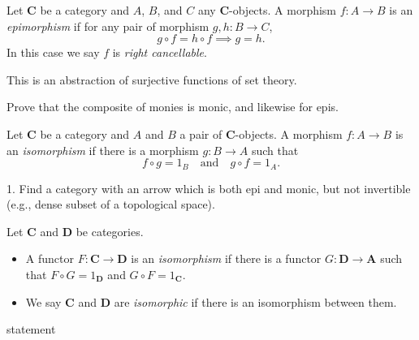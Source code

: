 \begin{definition}[Epimorphism]
    Let \(\mathbf{C}\) be a category and \(A\), \(B\), and \(C\) any   \(\mathbf{C}\)-objects.
    A morphism \(f\colon A\to B\) is an \textit{epimorphism} if for any pair of morphism \(g,h\colon B\to C\), \[g\circ f = h\circ f \implies g=h.\]
    In this case we say \(f\) is \textit{right cancellable}.
\end{definition}
\begin{remark}
    This is an abstraction of surjective functions of set theory.
\end{remark}

\begin{example}
    Prove that the composite of monies is monic, and likewise for epis.
\end{example}

\begin{definition}[Isomorphism]
    Let \(\mathbf{C}\) be a category and \(A\) and \(B\)    a pair of \(\mathbf{C}\)-objects. A  morphism \(f\colon A\to B\) is an \textit{isomorphism} if there is a morphism \(g\colon B\to A\) such that \[f\circ g = 1_B\quad\text{and}\quad g\circ f = 1_A.\]
\end{definition}

\begin{remark}
    [maclane] 1. Find a category with an arrow which is both epi and monic, but not invertible
    (e.g., dense subset of a topological space).
\end{remark}



\begin{definition}
    Let \(\mathbf{C}\) and \(\mathbf{D}\) be categories.
    \begin{itemize}[]
        \item A functor \(F\colon \mathbf{C}\to \mathbf{D}\) is an \textit{isomorphism} if there is a functor \(G\colon \mathbf{D}\to \mathbf{A}\) such that \(F\circ G = 1_{\mathbf{D}}\) and \(G\circ F = 1_{\mathbf{C}}\).
        \item We say \(\mathbf{C}\) and \(\mathbf{D}\) are \textit{isomorphic} if there is an isomorphism between them.
    \end{itemize}
\end{definition}


\begin{theorem}[on isomorphisms]
    statement
\end{theorem}


